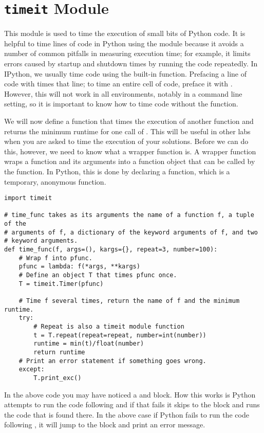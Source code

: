 \section*{\texttt{timeit} Module}
This module is used to time the execution of small bits of Python code.
It is helpful to time lines of code in Python using the  module because it avoids a number of common pitfalls in measuring execution time; for example, it limits errors caused by startup and shutdown times by running the code repeatedly. In IPython, we usually time code using the built-in  function. Prefacing a line of code with  times that line; to time an entire cell of code, preface it with . However, this will not work in all environments, notably in a command line setting, so it is important to know how to time code without the  function.

We will now define a function that times the execution of another function  and returns the minimum runtime for one call of . This will be useful in other labs when you are asked to time the execution of your solutions. Before we can do this, however, we need to know what a wrapper function is. A wrapper function wraps a function and its arguments into a function object that can be called by the  function. In Python, this is done by declaring a  function, which is a temporary, anonymous function.

\begin{lstlisting}
import timeit

# time_func takes as its arguments the name of a function f, a tuple of the
# arguments of f, a dictionary of the keyword arguments of f, and two 
# keyword arguments.
def time_func(f, args=(), kargs={}, repeat=3, number=100):
	# Wrap f into pfunc.
	pfunc = lambda: f(*args, **kargs)
	# Define an object T that times pfunc once.
	T = timeit.Timer(pfunc)

	# Time f several times, return the name of f and the minimum runtime.
	try:
		# Repeat is also a timeit module function
		t = T.repeat(repeat=repeat, number=int(number))
		runtime = min(t)/float(number)
		return runtime
	# Print an error statement if something goes wrong.
	except:
		T.print_exc()
\end{lstlisting}

In the above code you may have noticed a  and  block. How this works is Python attempts to run the code following  and if that fails it skips to the  block and runs the code that is found there. In the above case if Python fails to run the code following , it will jump to the  block and print an error message.

